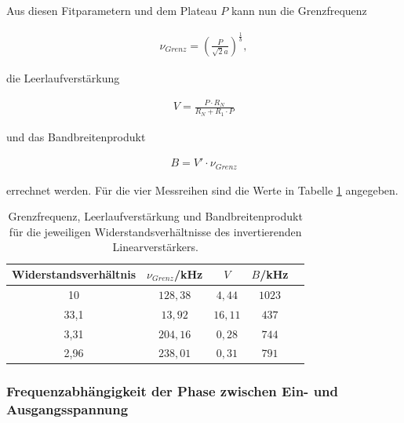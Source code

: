                 Aus diesen Fitparametern und dem Plateau $P$ kann nun die Grenzfrequenz 

                \begin{align*}
                    \nu_{Grenz} = \left(\frac{P}{\sqrt{2}a}\right)^{\frac1b},
                \end{align*}

                die Leerlaufverstärkung 

                \begin{align*}
                    V = \frac{P\cdot R_N}{R_N+R_1\cdot P}
                \end{align*}

                und das Bandbreitenprodukt

                \begin{align*}
                    B = V'\cdot \nu_{Grenz}
                \end{align*}

                errechnet werden. Für die vier Messreihen sind die Werte in Tabelle \ref{tab:grenz} angegeben.


                \begin{table}
                    \centering
                    \caption{Grenzfrequenz, Leerlaufverstärkung und Bandbreitenprodukt für die jeweiligen Widerstandsverhältnisse
                    des invertierenden Linearverstärkers.}
                    \label{tab:grenz}
                    \begin{tabular}{c c c c c}
                        \toprule
                            Widerstandsverhältnis & $\nu_{Grenz}$/kHz & $V$ & $B$/kHz\\
                        \midrule
                            10   & $ 128,38 $ & $  4,44 $ & $ 1023 $ \\
                            33,1 & $  13,92 $ & $ 16,11 $ & $  437 $ \\
                            3,31 & $ 204,16 $ & $  0,28 $ & $  744 $ \\
                            2,96 & $ 238,01 $ & $  0,31 $ & $  791 $ \\
                        \bottomrule
                    \end{tabular}
                \end{table}

            \subsubsection{Frequenzabhängigkeit der Phase zwischen Ein- und Ausgangsspannung}


